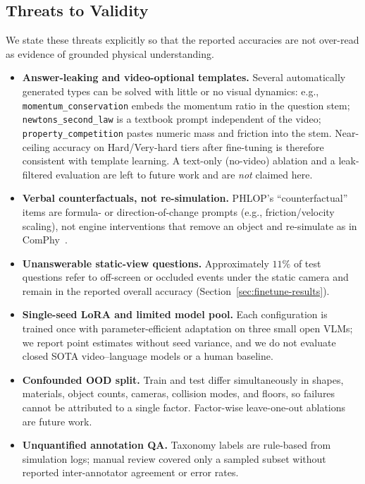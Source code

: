 \documentclass[conference]{IEEEtran}
\begin{document}
\subsection{Threats to Validity}
\label{sec:threats}

We state these threats explicitly so that the reported accuracies are not over-read as evidence of grounded physical understanding.

\begin{itemize}
    \item \textbf{Answer-leaking and video-optional templates.}
    Several automatically generated types can be solved with little or no visual dynamics: e.g., \texttt{momentum\_conservation} embeds the momentum ratio in the question stem; \texttt{newtons\_second\_law} is a textbook prompt independent of the video; \texttt{property\_competition} pastes numeric mass and friction into the stem. Near-ceiling accuracy on Hard/Very-hard tiers after fine-tuning is therefore consistent with template learning. A text-only (no-video) ablation and a leak-filtered evaluation are left to future work and are \emph{not} claimed here.

    \item \textbf{Verbal counterfactuals, not re-simulation.}
    PHLOP's ``counterfactual'' items are formula- or direction-of-change prompts (e.g., friction/velocity scaling), not engine interventions that remove an object and re-simulate as in ComPhy~\cite{chen2022comphy}.

    \item \textbf{Unanswerable static-view questions.}
    Approximately $11\%$ of test questions refer to off-screen or occluded events under the static camera and remain in the reported overall accuracy (Section~\ref{sec:finetune-results}).

    \item \textbf{Single-seed LoRA and limited model pool.}
    Each configuration is trained once with parameter-efficient adaptation on three small open VLMs; we report point estimates without seed variance, and we do not evaluate closed SOTA video--language models or a human baseline.

    \item \textbf{Confounded OOD split.}
    Train and test differ simultaneously in shapes, materials, object counts, cameras, collision modes, and floors, so failures cannot be attributed to a single factor. Factor-wise leave-one-out ablations are future work.

    \item \textbf{Unquantified annotation QA.}
    Taxonomy labels are rule-based from simulation logs; manual review covered only a sampled subset without reported inter-annotator agreement or error rates.


\end{itemize}
\end{document}
